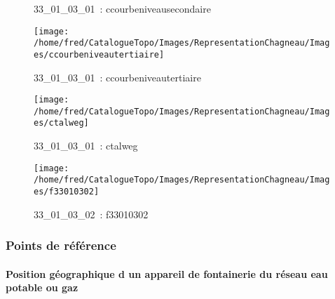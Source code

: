 \documentclass[12pt,titlepage]{book}
\begin{document}
\begin{figure}[h!]
\begin{minipage}[t]{3cm}
\begin{center}
      \caption[~33\_01\_03\_01]{\small{33\_01\_03\_01~:} \tiny{ccourbeniveausecondaire}}\label{ccourbeniveausecondaire}
    \end{center}
  \end{minipage}
  \begin{minipage}[t]{3cm}
    \begin{center}
      \texttt{[image: /home/fred/CatalogueTopo/Images/RepresentationChagneau/Images/ccourbeniveautertiaire]}
      \caption[~33\_01\_03\_01]{\small{33\_01\_03\_01~:} \tiny{ccourbeniveautertiaire}}\label{ccourbeniveautertiaire}
    \end{center}
  \end{minipage}
  \begin{minipage}[t]{3cm}
    \begin{center}
      \texttt{[image: /home/fred/CatalogueTopo/Images/RepresentationChagneau/Images/ctalweg]}
      \caption[~33\_01\_03\_01]{\small{33\_01\_03\_01~:} \tiny{ctalweg}}\label{ctalweg}
    \end{center}
  \end{minipage}
  \begin{minipage}[t]{3cm}
    \begin{center}
      \texttt{[image: /home/fred/CatalogueTopo/Images/RepresentationChagneau/Images/f33010302]}
      \caption[~33\_01\_03\_02]{\small{33\_01\_03\_02~:} \tiny{f33010302}}\label{f33010302}
    \end{center}
  \end{minipage}
\end{figure}

\subsubsection{\large Points de référence}
\paragraph{Position géographique d un appareil de fontainerie du réseau eau potable ou gaz}
\noindent
\vspace{\baselineskip}
\end{document}
